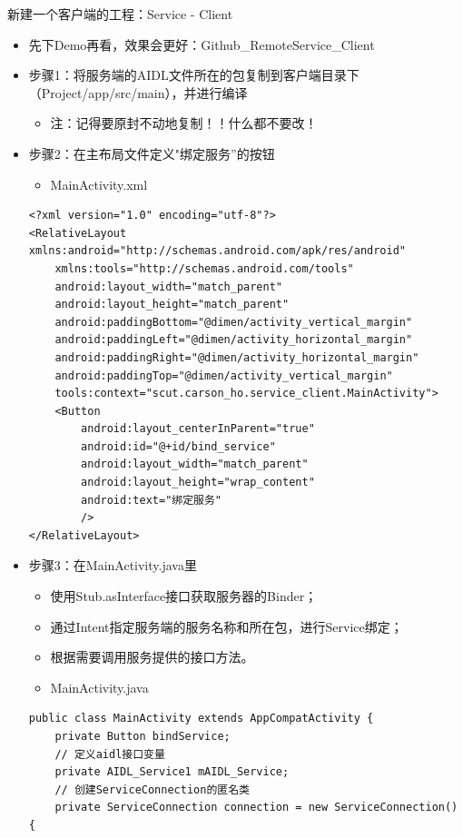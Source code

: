 \documentclass[9pt, b5paper]{article}
\begin{document}
新建一个客户端的工程：Service - Client
\begin{itemize}
\item 先下Demo再看，效果会更好：Github\_RemoteService\_Client
\item 步骤1：将服务端的AIDL文件所在的包复制到客户端目录下（Project/app/src/main），并进行编译
\begin{itemize}
\item 注：记得要原封不动地复制！！什么都不要改！
\end{itemize}
\item 步骤2：在主布局文件定义"绑定服务”的按钮
\begin{itemize}
\item MainActivity.xml
\end{itemize}
\begin{verbatim}
<?xml version="1.0" encoding="utf-8"?>
<RelativeLayout xmlns:android="http://schemas.android.com/apk/res/android"
    xmlns:tools="http://schemas.android.com/tools"
    android:layout_width="match_parent"
    android:layout_height="match_parent"
    android:paddingBottom="@dimen/activity_vertical_margin"
    android:paddingLeft="@dimen/activity_horizontal_margin"
    android:paddingRight="@dimen/activity_horizontal_margin"
    android:paddingTop="@dimen/activity_vertical_margin"
    tools:context="scut.carson_ho.service_client.MainActivity">
    <Button
        android:layout_centerInParent="true"
        android:id="@+id/bind_service"
        android:layout_width="match_parent"
        android:layout_height="wrap_content"
        android:text="绑定服务"
        />
</RelativeLayout>
\end{verbatim}
\item 步骤3：在MainActivity.java里
\begin{itemize}
\item 使用Stub.asInterface接口获取服务器的Binder；
\item 通过Intent指定服务端的服务名称和所在包，进行Service绑定；
\item 根据需要调用服务提供的接口方法。
\item MainActivity.java
\end{itemize}
\begin{verbatim}
public class MainActivity extends AppCompatActivity {
    private Button bindService;
    // 定义aidl接口变量
    private AIDL_Service1 mAIDL_Service;
    // 创建ServiceConnection的匿名类
    private ServiceConnection connection = new ServiceConnection() {

\end{verbatim}
\end{itemize}
\end{document}
